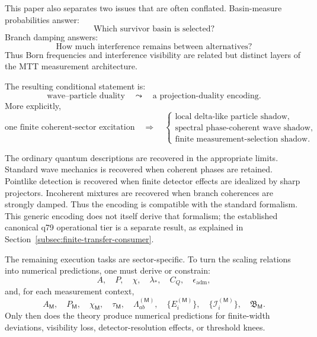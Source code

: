 \documentclass[11pt]{article}
\newcommand{\epsadm}{\epsilon_{\mathrm{adm}}}
\newcommand{\Meas}{\mathsf M}
\begin{document}
This paper also separates two issues that are often conflated. Basin-measure probabilities
answer:
\begin{equation}
  \text{Which survivor basin is selected?}
\end{equation}
Branch damping answers:
\begin{equation}
  \text{How much interference remains between alternatives?}
\end{equation}
Thus Born frequencies and interference visibility are related but distinct layers of the MTT
measurement architecture.

The resulting conditional statement is:
\begin{equation}
  \boxed{
  \text{wave--particle duality}
  \quad\leadsto\quad
  \text{a projection-duality encoding}.
  }
\end{equation}
More explicitly,
\begin{equation}
  \boxed{
  \text{one finite coherent-sector excitation}
  \quad\Longrightarrow\quad
  \begin{cases}
  \text{local delta-like particle shadow},\\
  \text{spectral phase-coherent wave shadow},\\
  \text{finite measurement-selection shadow}.
  \end{cases}
  }
\end{equation}

The ordinary quantum descriptions are recovered in the appropriate limits. Standard wave
mechanics is recovered when coherent phases are retained. Pointlike detection is recovered
when finite detector effects are idealized by sharp projectors. Incoherent mixtures are
recovered when branch coherences are strongly damped. Thus the encoding is compatible with
the standard formalism. This generic encoding does not itself derive that
formalism; the established canonical q79 operational tier is a separate
result, as explained in Section~\ref{subsec:finite-transfer-consumer}.

The remaining execution tasks are sector-specific. To turn the scaling relations into numerical
predictions, one must derive or constrain:
\begin{equation}
  A,\quad P,\quad \chi,\quad \lambda_\ast,\quad C_Q,\quad \epsadm,
\end{equation}
and, for each measurement context,
\begin{equation}
  A_{\Meas},\quad P_{\Meas},\quad \chi_{\Meas},\quad \tau_{\Meas},\quad
  \Lambda_{ab}^{(\Meas)},\quad \{E_i^{(\Meas)}\},\quad
  \{\mathcal I_i^{(\Meas)}\},\quad \mathfrak B_{\Meas}.
\end{equation}
Only then does the theory produce numerical predictions for finite-width deviations,
visibility loss, detector-resolution effects, or threshold knees.
\end{document}
